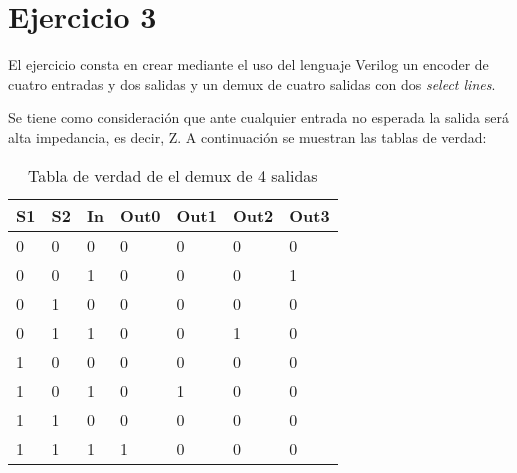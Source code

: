\newpage
\section{Ejercicio 3}
\noindent
El ejercicio consta en crear mediante el uso del lenguaje Verilog un encoder de cuatro entradas y dos salidas y un demux de cuatro salidas con dos \textit{select lines}.\par
Se tiene como consideración que ante cualquier entrada no esperada la salida será alta impedancia, es decir, Z.\newline
A continuaci\'on se muestran las tablas de verdad:

\begin{table}[H]
    \center
    \begin{tabular}{|lll|llll|}
    \hline
    \textbf{S1} & \textbf{S2} & \textbf{In} & \textbf{Out0} & \textbf{Out1} & \textbf{Out2} & \textbf{Out3} \\ \hline
    0           & 0           & 0           & 0             & 0             & 0             & 0             \\
    0           & 0           & 1           & 0             & 0             & 0             & 1             \\
    0           & 1           & 0           & 0             & 0             & 0             & 0             \\
    0           & 1           & 1           & 0             & 0             & 1             & 0             \\
    1           & 0           & 0           & 0             & 0             & 0             & 0             \\
    1           & 0           & 1           & 0             & 1             & 0             & 0             \\
    1           & 1           & 0           & 0             & 0             & 0             & 0             \\
    1           & 1           & 1           & 1             & 0             & 0             & 0             \\ \hline
    \end{tabular}
    \caption{Tabla de verdad de el demux de 4 salidas}
    \end{table}

